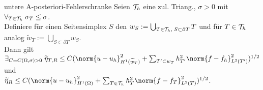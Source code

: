 \begin{Satz}{untere A-posteriori-Fehlerschranke}
    Seien $\mathcal{T}_h$ eine zul. Triang., $\sigma > 0$ mit
    $\forall_{T \in \mathcal{T}_h}\; \sigma_T \le \sigma$.\\
    Definiere für einen Seitensimplex $S$ den
    $w_S := \bigcup_{T \in \mathcal{T}_h,\; S \subset \partial T} T$ und
    für $T \in \mathcal{T}_h$ analog $\widetilde{w}_T := \bigcup_{S \subset \partial T} w_S$.\\
    Dann gilt $\exists_{C = C(\Omega, \sigma) > 0}\;
    \widetilde{\eta}_{T,R} \le
    C(\norm{u - u_h}_{H^1(\widetilde{w}_T)}^2 +
    \sum_{T' \subset w_T} h_{T'}^2 \norm{f - f_h}_{L^2(T')}^2)^{1/2}$ und\\
    $\widetilde{\eta}_R \le C(\norm{u - u_h}_{H^1(\Omega)}^2 +
    \sum_{T \in \T_h} h_T^2 \norm{f - f_T}_{L^2(T)}^2)^{1/2}$.
\end{Satz}

\pagebreak
